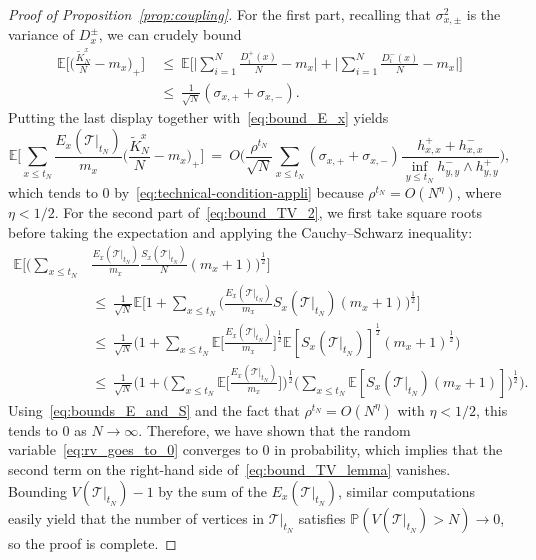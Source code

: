 \begin{refsegment}
\begin{proof}[Proof of Proposition~\ref{prop:coupling}]
For the first part, recalling that $\sigma_{x,\pm}^2$ is the
variance of $D^{\pm}_x$, we can crudely bound
\begin{align*}
  \mathbb{E}\Big[\Big(\frac{\tilde{K}_N^{x}}{N}-m_x\Big)_+\Big]\
  &\leq\ \mathbb{E}\Big[\Big|\sum_{i=1}^N \frac{D^+_i(x)}{N} - m_x\Big| + \Big|\sum_{i=1}^N \frac{D^-_i(x)}{N} - m_x\Big|\Big]\\
  &\leq\ \frac{1}{\sqrt{N}} (\sigma_{x,+}+\sigma_{x,-}).
\end{align*}
Putting the last display together with~\eqref{eq:bound_E_x} yields
\begin{equation*}
    \mathbb{E} \bigg[\sum_{x\leq t_N}\frac{E_x(\mathcal{T}|_{t_N})}{m_x}
  \Big(\frac{\tilde{K}_N^{x}}{N} - m_x\Big)_+\bigg] \
   =\ O\bigg(\frac{\rho^{t_N}}{\sqrt{N}} \sum_{x\leq t_N}
(\sigma_{x,+}+\sigma_{x,-})\frac{h^+_{x,x}+h^-_{x,x}}{\inf_{y\leq t_N}
    h^-_{y,y}\wedge h^+_{y,y}} \bigg),
\end{equation*}
which tends to $0$ by~\eqref{eq:technical-condition-appli}
because $\rho^{t_N}=O(N^{\eta})$, where $\eta<1/2$. For the second part
of~\eqref{eq:bound_TV_2}, we first take square roots before taking the expectation and applying the Cauchy--Schwarz inequality:
\begin{align*}
  \mathbb{E}\bigg[ \bigg(\sum_{x\leq
    t_N}&\frac{E_x(\mathcal{T}|_{t_N})}{m_x}\frac{S_x(\mathcal{T}|_{t_N})}{N}
    (m_x + 1) \bigg)^{\frac{1}{2}} \bigg] \\
  &\leq\ \frac{1}{\sqrt{N}} \mathbb{E}\bigg[ 1 + \sum_{x\leq
    t_N}\bigg(\frac{E_x(\mathcal{T}|_{t_N})}{m_x}S_x(\mathcal{T}|_{t_N})
    (m_x + 1) \bigg)^{\frac{1}{2}} \bigg] \\
  &\leq\ \frac{1}{\sqrt{N}} \bigg(1 + \sum_{x\leq
    t_N}\mathbb{E}\Big[\frac{E_x(\mathcal{T}|_{t_N})}{m_x}\Big]^{\frac{1}{2}}
    \mathbb{E}[S_x(\mathcal{T}|_{t_N})]^{\frac{1}{2}}
    (m_x + 1)^{\frac{1}{2}}\bigg) \\
  &\leq\ \frac{1}{\sqrt{N}} \bigg(1 + \bigg(\sum_{x\leq
    t_N}\mathbb{E}\Big[\frac{E_x(\mathcal{T}|_{t_N})}{m_x}\Big]
    \bigg)^{\frac{1}{2}} \bigg(\sum_{x\leq t_N}
    \mathbb{E}[S_x(\mathcal{T}|_{t_N}) (m_x +
    1)]\bigg)^{\frac{1}{2}} \bigg).
\end{align*}
Using~\eqref{eq:bounds_E_and_S} and the fact that
$\rho^{t_N}=O(N^\eta)$ with $\eta<1/2$, this tends to $0$ as
$N\to \infty$. Therefore, we have shown that the random
variable~\eqref{eq:rv_goes_to_0} converges to $0$ in probability, which implies that the second term on the right-hand side
of~\eqref{eq:bound_TV_lemma} vanishes. Bounding
$V(\mathcal{T}|_{t_N}) - 1$ by the sum of the
$E_x(\mathcal{T}|_{t_N})$, similar computations easily yield that the number of vertices in $\mathcal{T}|_{t_N}$ satisfies
$\mathbb{P}(V(\mathcal{T}|_{t_N})>N)\to 0$, so the proof is complete.
\end{proof}


\begin{singlespace}
\setlength{}
\small\printbibliography[ segment=\therefsegment,heading=subbibliography, title=References for Chapter~\ref{chp2_ks_countable}]
\end{singlespace}
\end{refsegment}